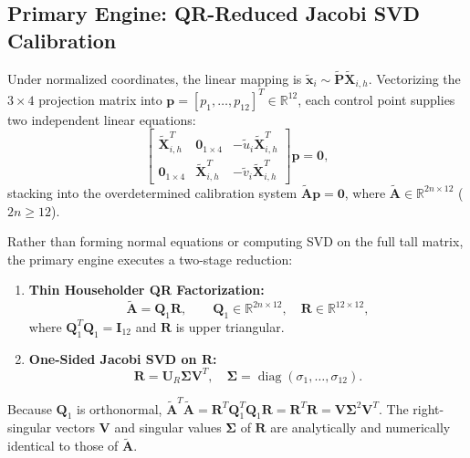 \documentclass[journal]{IEEEtran}
\begin{document}
\subsection{Primary Engine: QR-Reduced Jacobi SVD Calibration}
Under normalized coordinates, the linear mapping is $\tilde{\mathbf{x}}_i \sim \tilde{\mathbf{P}} \tilde{\mathbf{X}}_{i,h}$. Vectorizing the $3 \times 4$ projection matrix into $\mathbf{p} = [p_1, \dots, p_{12}]^T \in \mathbb{R}^{12}$, each control point supplies two independent linear equations:
\begin{equation}
\begin{bmatrix}
\tilde{\mathbf{X}}_{i,h}^T & \mathbf{0}_{1 \times 4} & -\tilde{u}_i \tilde{\mathbf{X}}_{i,h}^T \\
\mathbf{0}_{1 \times 4} & \tilde{\mathbf{X}}_{i,h}^T & -\tilde{v}_i \tilde{\mathbf{X}}_{i,h}^T
\end{bmatrix} \mathbf{p} = \mathbf{0},
\label{eq:dlt_rows}
\end{equation}
stacking into the overdetermined calibration system $\tilde{\mathbf{A}} \mathbf{p} = \mathbf{0}$, where $\tilde{\mathbf{A}} \in \mathbb{R}^{2n \times 12}$ ($2n \ge 12$).

Rather than forming normal equations or computing SVD on the full tall matrix, the primary engine executes a two-stage reduction:
\begin{enumerate}
    \item \textbf{Thin Householder QR Factorization:}
    \begin{equation}
    \tilde{\mathbf{A}} = \mathbf{Q}_1 \mathbf{R}, \qquad \mathbf{Q}_1 \in \mathbb{R}^{2n \times 12}, \quad \mathbf{R} \in \mathbb{R}^{12 \times 12},
    \end{equation}
    where $\mathbf{Q}_1^T \mathbf{Q}_1 = \mathbf{I}_{12}$ and $\mathbf{R}$ is upper triangular.
    \item \textbf{One-Sided Jacobi SVD on $\mathbf{R}$:}
    \begin{equation}
    \mathbf{R} = \mathbf{U}_R \mathbf{\Sigma} \mathbf{V}^T, \quad \mathbf{\Sigma} = \operatorname{diag}(\sigma_1, \dots, \sigma_{12}).
    \end{equation}
\end{enumerate}
Because $\mathbf{Q}_1$ is orthonormal, $\tilde{\mathbf{A}}^T \tilde{\mathbf{A}} = \mathbf{R}^T \mathbf{Q}_1^T \mathbf{Q}_1 \mathbf{R} = \mathbf{R}^T \mathbf{R} = \mathbf{V} \mathbf{\Sigma}^2 \mathbf{V}^T$. The right-singular vectors $\mathbf{V}$ and singular values $\mathbf{\Sigma}$ of $\mathbf{R}$ are analytically and numerically identical to those of $\tilde{\mathbf{A}}$.
\end{document}
